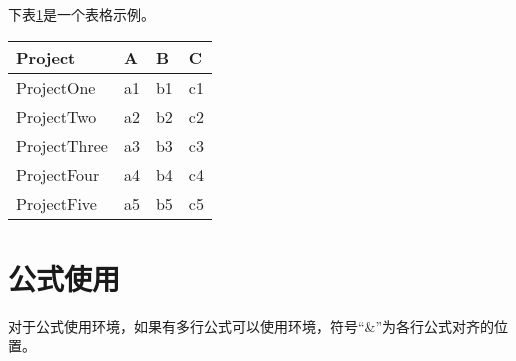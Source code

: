 \begin{spacing}{1.5}
	下表\ref{sampeltable}是一个表格示例。
	
	{\wuhao\songti
		\begin{table}[htb]
			\begin{center}
				\label{sampeltable}
				\begin{tabular}{m{3cm} m{2cm} m{2cm} m{2cm}}
					\bottomrule
					Project & A & B & C\\
					\hline
					ProjectOne& a1 & b1 & c1 \\
					ProjectTwo & a2 & b2 & c2 \\
					ProjectThree & a3 & b3 & c3 \\
					ProjectFour& a4 & b4 & c4 \\
					ProjectFive & a5& b5 & c5 \\
					\bottomrule
				\end{tabular}
			\end{center}
	\end{table}}
	
	\section{公式使用}
	对于公式使用环境，如果有多行公式可以使用环境，符号“\&”为各行公式对齐的位置。
	

\end{spacing}
